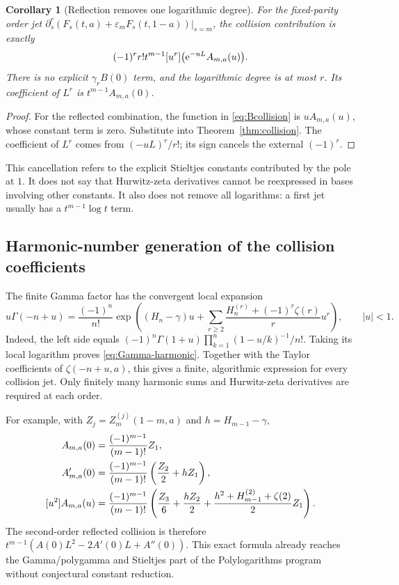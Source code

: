 \documentclass[11pt,a4paper]{article}
\numberwithin{equation}{section}
\newtheorem{corollary}[theorem]{Corollary}
\theoremstyle{definition}\newtheorem{definition}[theorem]{Definition}
\theoremstyle{remark}\newtheorem{remark}[theorem]{Remark}
\newcommand{\eps}{\varepsilon}\newcommand{\muh}{\widehat\mu}
\newcommand{\coef}[2]{[#1^{#2}]}
\begin{document}
\begin{corollary}[Reflection removes one logarithmic degree]
\label{cor:collision-reflection}
For the fixed-parity order jet
$\partial_s^r(F_s(t,a)+\eps_mF_s(t,1-a))|_{s=m}$, the collision
contribution is exactly
\begin{equation}
 (-1)^rr!t^{m-1}\coef{u}{r}
                       \bigl(\e^{-uL}A_{m,a}(u)\bigr).
 \label{eq:collision-reflected}
\end{equation}
There is no explicit $\gamma_r B(0)$ term, and the logarithmic degree
is at most $r$. Its coefficient of $L^r$ is $t^{m-1}A_{m,a}(0)$.
\end{corollary}
\begin{proof}
For the reflected combination, the function in
\eqref{eq:Bcollision} is $uA_{m,a}(u)$, whose constant term is zero.
Substitute into Theorem~\ref{thm:collision}. The coefficient of $L^r$
comes from $(-uL)^r/r!$; its sign cancels the external $(-1)^r$.
\end{proof}

This cancellation refers to the explicit Stieltjes constants contributed
by the pole at $1$. It does not say that Hurwitz-zeta derivatives cannot
be reexpressed in bases involving other constants. It also does not
remove all logarithms: a first jet usually has a $t^{m-1}\log t$ term.

\subsection{Harmonic-number generation of the collision coefficients}
The finite Gamma factor has the convergent local expansion
\begin{equation}
 u\Gamma(-n+u)=\frac{(-1)^n}{n!}
 \exp\left((H_n-\gamma)u+
 \sum_{r\ge2}\frac{H_n^{(r)}+(-1)^r\zeta(r)}r u^r\right),
 \qquad |u|<1.
 \label{eq:Gamma-harmonic}
\end{equation}
Indeed, the left side equals
$(-1)^n\Gamma(1+u)\prod_{k=1}^n(1-u/k)^{-1}/n!$.
Taking its local logarithm proves \eqref{eq:Gamma-harmonic}. Together
with the Taylor coefficients of $\zeta(-n+u,a)$, this gives a finite,
algorithmic expression for every collision jet. Only finitely many
harmonic sums and Hurwitz-zeta derivatives are required at each order.

For example, with $Z_j=Z_m^{(j)}(1-m,a)$ and $h=H_{m-1}-\gamma$,
\begin{align}
 A_{m,a}(0)&=\frac{(-1)^{m-1}}{(m-1)!}Z_1,\notag\\
 A_{m,a}'(0)&=\frac{(-1)^{m-1}}{(m-1)!}
                               \left(\frac{Z_2}{2}+hZ_1\right),\notag\\
 \coef{u}{2}A_{m,a}(u)&=\frac{(-1)^{m-1}}{(m-1)!}
 \left(\frac{Z_3}{6}+\frac{hZ_2}{2}
       +\frac{h^2+H_{m-1}^{(2)}+\zeta(2)}2 Z_1\right).
 \label{eq:A-coefficients}
\end{align}
The second-order reflected collision is therefore
$t^{m-1}(A(0)L^2-2A'(0)L+A''(0))$.
This exact formula already reaches the Gamma/polygamma and Stieltjes
part of the Polylogarithms program without conjectural constant
reduction.
\end{document}
